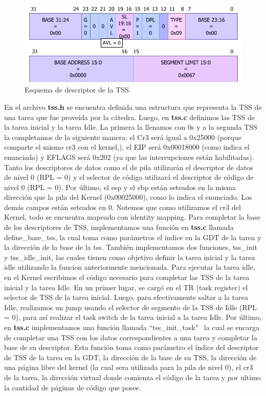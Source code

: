 \documentclass[a4paper]{article}
\begin{document}
\begin{figure}[h]
	\centering
	\includegraphics[scale=0.7]{img/TssdescriptorManual.pdf}
	\caption{Esquema de descriptor de la TSS.}
\end{figure}

\justify
En el archivo \textbf{tss.h} se encuentra definida una estructura que representa la TSS de una tarea que fue proveída por la cátedra. Luego, en \textbf{tss.c} definimos las TSS de la tarea inicial y la tarea Idle. La primera la llenamos con 0s y a la segunda TSS la completamos de la siguiente manera: el Cr3 será igual a 0x25000 (porque comparte el mismo cr3 con el kernel,), el EIP será 0x00018000 (como indica el enunciado) y EFLAGS será 0x202 (ya que las interrupciones están habilitadas). Tanto los descriptores de datos como el de pila utilizarán el descriptor de datos de nivel 0 (RPL = 0) y el selector de código utilizará el descriptor de código de nivel 0 (RPL = 0). Por último, el esp y el ebp están seteados en la misma dirección que la pila del Kernel (0x00025000), como lo indica el enunciado. Los demás campos están seteados en 0. Notemos que como utilizamos el cr3 del Kernel, todo se encuentra mapeado con identity mapping.
\justify
Para completar la base de los descriptores de TSS, implementamos una función en \textbf{tss.c} llamada define_base_tss, la cual toma como parámetros el indice en la GDT de la tarea y la dirección de la base de la tss. También implementamos dos funciones, tss_init y tss_idle_init, las cuales tienen como objetivo definir la tarea inicial y la tarea idle utilizando la funcion anteriormente mencionada.
\justify
Para ejecutar la tarea idle, en el Kernel escribimos el código necesario para completar las TSS de la tarea inicial y la tarea Idle. En un primer lugar, se cargó en el TR (task register) el selector de TSS de la tarea inicial. Luego, para efectivamente saltar a la tarea Idle, realizamos un jump usando el selector de segmento de la TSS de Idle (RPL = 0), para así realizar el task switch de la tarea inicial a la tarea Idle.
\justify
Por último, en \textbf{tss.c} implementamos una función llamada ``tss_init_task" \, la cual se encarga de completar una TSS con los datos correspondientes a una tarea y completar la base de su descriptor. Esta función toma como parámetro el índice del descriptor de TSS de la tarea en la GDT, la dirección de la base de su TSS, la dirección de una página libre del kernel (la cual sera utilizada para la pila de nivel $0$), el cr3 de la tarea, la dirección virtual donde comienza el código de la tarea y por ultimo la cantidad de páginas de código que posee.
\end{document}
